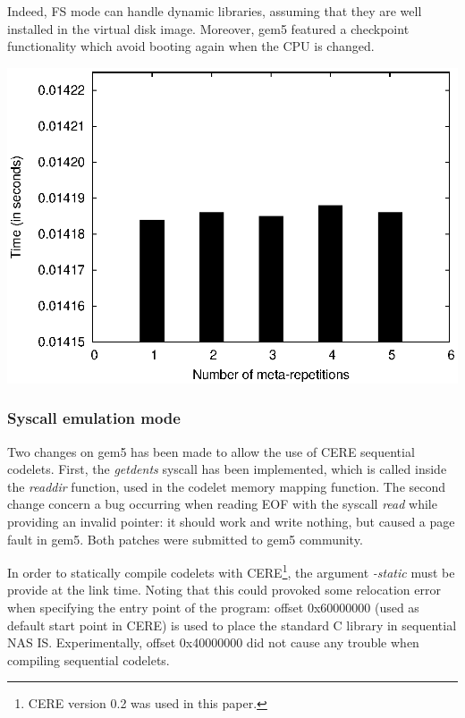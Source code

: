 \documentclass{article}
\newenvironment{Figure}
  {\par\medskip\noindent\center\minipage{0.9\linewidth}}
  {\endminipage\par\bigskip\medskip}
\begin{document}
\begin{multicols}{2}
Indeed, FS mode can handle dynamic libraries, assuming that they are well installed in the virtual disk image. 
Moreover, gem5 featured a checkpoint functionality which avoid booting again when the CPU is changed.


\begin{Figure}
\centering
\includegraphics[width=\linewidth]{vari_se.eps}
\end{Figure}

\subsubsection{Syscall emulation mode}
Two changes on gem5 has been made to allow the use of CERE sequential codelets. First, the \textit{getdents} syscall has been implemented, which is called inside the \textit{readdir} function, used in the codelet memory mapping function.
The second change concern a bug occurring when reading EOF with the syscall \textit{read} while providing an invalid pointer: it should work and write nothing, but caused a page fault in gem5. Both patches were submitted to gem5 community.


In order to statically compile codelets with CERE\footnote{CERE version 0.2 was used in this paper.}, the argument \textit{-static} must be provide at the link time. Noting that this could provoked some relocation error when specifying the entry point of the program: offset 0x60000000 (used as default start point in CERE) is used to place the standard C library in sequential NAS IS. Experimentally, offset 0x40000000 did not cause any trouble when compiling sequential codelets. 



\end{multicols}
\end{document}
